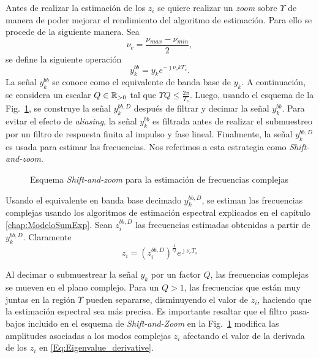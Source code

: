 			Antes de realizar la estimación de los $z_i$ se quiere realizar un \emph{zoom} sobre $\Upsilon$ de manera de poder mejorar el rendimiento del algoritmo de estimación. Para ello se procede de la siguiente manera. Sea 
			\[\nu_c = \frac{\nu_{max}-\nu_{min}}{2},\]
			se define la siguiente operación
			\begin{equation}
				y_k^{bb} = y_ke^{-\jmath\nu_c kT_s}.
				\label{Eq:BaseBandSignal}
			\end{equation} 
			La señal $y_k^{bb}$ se conoce como el equivalente de banda base de $y_k$. A continuación, se considera un escalar $Q\in\mathbb{R}_{>0}$ tal que $\Upsilon Q\le \frac{2\pi}{T_s}$. Luego, usando el esquema de la Fig.~\ref{Fig:BlockDiagram2}, se construye la señal $y_k^{bb,D}$ después de filtrar y decimar la señal $y_k^{bb}$. Para evitar el efecto de \emph{aliasing}, la señal $y_k^{bb}$ es filtrada antes de realizar el submuestreo por un filtro de respuesta finita al impulso y fase lineal. Finalmente, la señal $y_k^{bb,D}$ es usada para estimar las frecuencias. Nos referimos a esta estrategia como \emph{Shift-and-zoom}.
	
			\begin{figure}[t]
				\centering
				\resizebox{\linewidth}{!}{}
				\caption{Esquema \emph{Shift-and-zoom}  para la estimación de frecuencias complejas}
				\label{Fig:BlockDiagram2}
			\end{figure}
	
			Usando el equivalente en banda base decimado $y_k^{bb,D}$, se estiman las frecuencias complejas usando los algoritmos de estimación espectral explicados en el capítulo \eqref{chap:ModeloSumExp}. Sean $z_i^{bb,D}$ las frecuencias estimadas obtenidas a partir de $y_k^{bb,D}$. Claramente
			\begin{equation}
				z_i = (z_i^{bb,D})^{\frac{1}{Q}}e^{\jmath\nu_cT_s}
				\label{Eq:EstimatedFrequencies}
			\end{equation}
	
			Al decimar o submuestrear la señal $y_k$ por un factor $Q$, las frecuencias complejas se mueven en el plano complejo. Para un $Q>1$, las frecuencias que están muy juntas en la región $\Upsilon$ pueden separarse, disminuyendo el valor de $\dot{z}_i$, haciendo que la estimación espectral sea más precisa. Es importante resaltar que el filtro pasa-bajos incluido en el esquema de \emph{Shift-and-Zoom} en la Fig.~\ref{Fig:BlockDiagram2} modifica las amplitudes asociadas a los modos complejas $z_i$ afectando el valor de la derivada de los $z_i$ en \eqref{Eq:Eigenvalue_derivative}.
	
